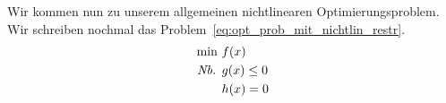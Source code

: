 Wir kommen nun zu unserem allgemeinen nichtlinearen Optimierungsproblem.
Wir schreiben nochmal das Problem~\eqref{eq:opt_prob_mit_nichtlin_restr}.
\begin{align}
       \min\ & f(x) \notag \\
         \text{\em Nb. } & g(x) \leq 0 \notag \\
             & h(x) = 0 \notag
\end{align}
